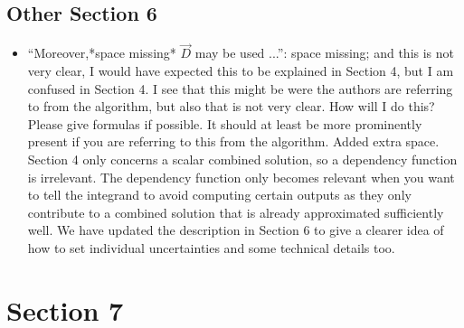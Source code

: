 \documentclass{article}[12pt]
\newcommand{\Referee}[1]{{\color{blue} #1 \newline}}
\begin{document}
\subsection*{Other Section 6}\label{sec:os6}

\begin{itemize}
    \item \Referee{``Moreover,*space missing* $\vec{D}$ may be used ...'': space missing; and this is not very clear, I would have expected this to be explained in Section 4, but I am confused in Section 4. I see that this might be were the authors are referring to from the algorithm, but also that is not very clear. How will I do this? Please give formulas if possible. It should at least be more prominently present if you are referring to this from the algorithm.}Added extra space. Section 4 only concerns a scalar combined solution, so a dependency function is irrelevant. The dependency function only becomes relevant when you want to tell the integrand to avoid computing certain outputs as they only contribute to a combined solution that is already approximated sufficiently well. We have updated the description in Section 6 to give a clearer idea of how to set individual uncertainties and some technical details too. 
\end{itemize}

\section*{Section 7}
\end{document}
